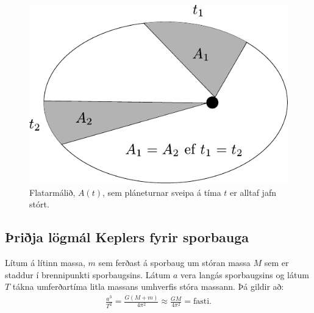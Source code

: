 \begin{figure}[H]
    \centering
    \includegraphics[scale = 0.8]{figures/keplersecondlaw.pdf}
    \caption{Flatarmálið, $A(t)$, sem pláneturnar sveipa á tíma $t$ er alltaf jafn stórt.}
    \label{fig:kepler2ndlaw}
\end{figure}



\subsection*{Þriðja lögmál Keplers fyrir sporbauga}

\begin{tcolorbox}
\begin{theorem}
    Lítum á lítinn massa, $m$ sem ferðast á sporbaug um stóran massa $M$ sem er staddur í brennipunkti sporbaugsins. Látum $a$ vera langás sporbaugsins og látum $T$ tákna umferðartíma litla massans umhverfis stóra massann. Þá gildir að:
\begin{align*}
    \frac{a^3}{T^2} = \frac{G(M+m)}{4\pi^2} \approx \frac{GM}{4\pi^2} = \text{fasti}.
\end{align*}
\end{theorem}
\end{tcolorbox}



